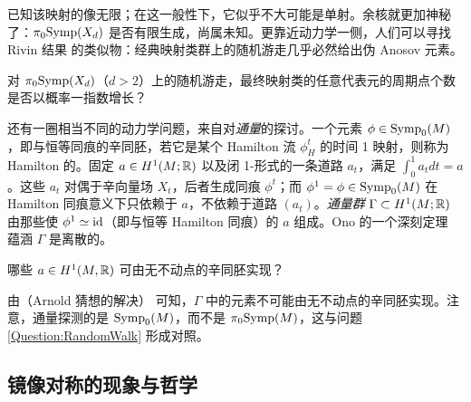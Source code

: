 已知该映射的像无限；在这一般性下，它似乎不大可能是单射。余核就更加神秘了：$\pi_0\mathrm{Symp}(X_d)$ 是否有限生成，尚属未知。更靠近动力学一侧，人们可以寻找 Rivin 结果 \cite{Rivin} 的类似物：经典映射类群上的随机游走几乎必然给出伪 Anosov 元素。

\begin{Question} \label{Question:RandomWalk} 对 $\pi_0\mathrm{Symp}(X_d)$（$d>2$）上的随机游走，最终映射类的任意代表元的周期点个数是否以概率一指数增长？ \end{Question}

还有一圈相当不同的动力学问题，来自对\emph{通量}的探讨。一个元素 $\phi \in \mathrm{Symp}_0(M)$，即与恒等同痕的辛同胚，若它是某个 Hamilton 流 $\phi_H^t$ 的时间 1 映射，则称为 Hamilton 的。固定 $a\in H^1(M;\mathbb{R})$ 以及闭 1-形式的一条道路 $a_t$，满足 $\int_0^1 a_t dt = a$。这些 $a_t$ 对偶于辛向量场 $X_t$，后者生成同痕 $\phi^t$；而 $\phi^1 = \phi \in \mathrm{Symp}_0(M)$ 在 Hamilton 同痕意义下只依赖于 $a$，不依赖于道路 $(a_t)$。\emph{通量群} $\Gamma \subset H^1(M;\mathbb{R})$ 由那些使 $\phi^1 \simeq \mathrm{id}$（即与恒等 Hamilton 同痕）的 $a$ 组成。Ono 的一个深刻定理 \cite{Ono} 蕴涵 $\Gamma$ 是离散的。

\begin{Question} 哪些 $a\in H^1(M,\mathbb{R})$ 可由无不动点的辛同胚实现？ \end{Question}


由（Arnold 猜想的解决）\cite{FOno, LiuTian} 可知，$\Gamma$ 中的元素不可能由无不动点的辛同胚实现。注意，通量探测的是 $\mathrm{Symp}_0(M)$，而不是 $\pi_0 \mathrm{Symp}(M)$，这与问题 \ref{Question:RandomWalk} 形成对照。

\subsection{镜像对称的现象与哲学}\label{Sec:Mirror}


